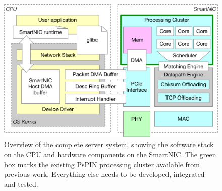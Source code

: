 \begin{figure}
    \centering
    \includegraphics[width=.9\linewidth]{figures/system-overview.pdf}
    \caption{Overview of the complete server system, showing the software stack on the CPU and hardware components on the SmartNIC.  The green box marks the existing PsPIN processing cluster available from previous work.  Everything else needs to be developed, integrated and tested.}
    \label{fig:full-system}
\end{figure}